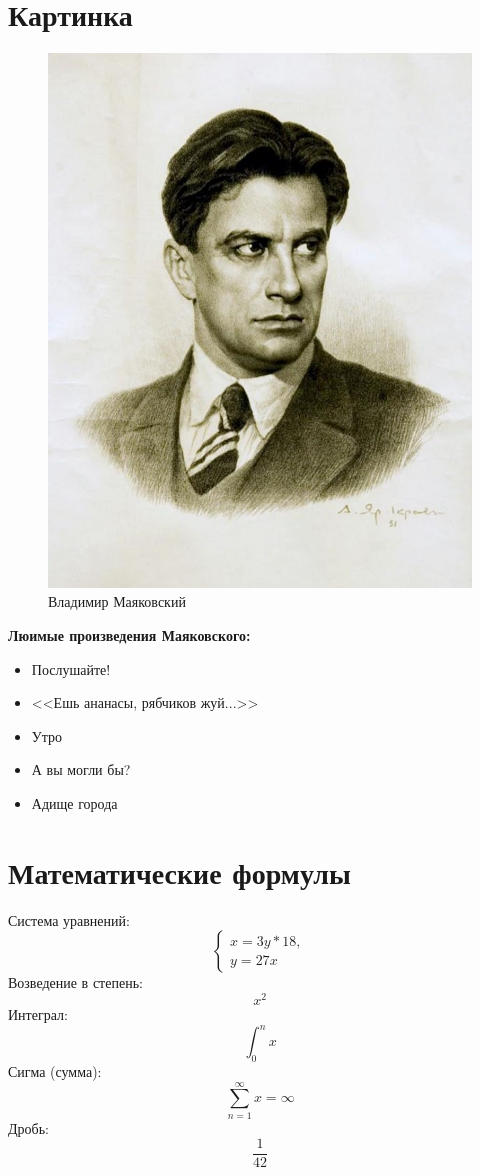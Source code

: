 \documentclass[a4paper, 12pt]{article}
\begin{document}
\section{\centering Картинка}
\begin{figure}[h]
    \centering
    \includegraphics{vladimir_mayakovskiy.jpg}
    \caption{Владимир Маяковский}
    \label{fig:AutorFace}
\end{figure}

\newpage
\textbf{Люимые произведения Маяковского:}
\begin{itemize}
    \item Послушайте!
    \item <<Ешь ананасы, рябчиков жуй...>>
    \item Утро
    \item А вы могли бы?
    \item Адище города
\end{itemize}

\newpage
\section{\centering Математические формулы}
Система уравнений:
\begin{equation*}
 \begin{cases}
   x = 3y * 18,
   \\
   y = 27x
 \end{cases}
\end{equation*}
Возведение в степень:
\[ x^2 \]
Интеграл:
\[ \int_{0}^{n} x \]
Сигма (сумма):
\[ \sum_{n=1}^{\infty} x = \infty \]
Дробь:
\[ \frac {1} {42} \]
\end{document}
